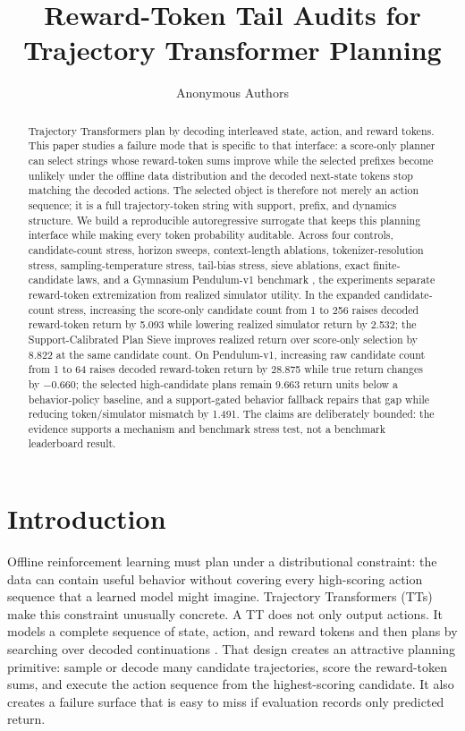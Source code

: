 \documentclass{article}
\title{Reward-Token Tail Audits for Trajectory Transformer Planning}
\author{Anonymous Authors}
\newcommand{\method}{Support-Calibrated Plan Sieve}
\begin{document}
\maketitle

\begin{abstract}
Trajectory Transformers plan by decoding interleaved state, action, and reward tokens. This paper studies a failure mode that is specific to that interface: a score-only planner can select strings whose reward-token sums improve while the selected prefixes become unlikely under the offline data distribution and the decoded next-state tokens stop matching the decoded actions. The selected object is therefore not merely an action sequence; it is a full trajectory-token string with support, prefix, and dynamics structure. We build a reproducible autoregressive surrogate that keeps this planning interface while making every token probability auditable. Across four controls, candidate-count stress, horizon sweeps, context-length ablations, tokenizer-resolution stress, sampling-temperature stress, tail-bias stress, sieve ablations, exact finite-candidate laws, and a Gymnasium Pendulum-v1 benchmark \citep{towers2024gymnasium}, the experiments separate reward-token extremization from realized simulator utility. In the expanded candidate-count stress, increasing the score-only candidate count from 1 to 256 raises decoded reward-token return by 5.093 while lowering realized simulator return by 2.532; the \method{} improves realized return over score-only selection by 8.822 at the same candidate count. On Pendulum-v1, increasing raw candidate count from 1 to 64 raises decoded reward-token return by 28.875 while true return changes by \(-0.660\); the selected high-candidate plans remain 9.663 return units below a behavior-policy baseline, and a support-gated behavior fallback repairs that gap while reducing token/simulator mismatch by 1.491. The claims are deliberately bounded: the evidence supports a mechanism and benchmark stress test, not a benchmark leaderboard result.
\end{abstract}

\section{Introduction}

Offline reinforcement learning must plan under a distributional constraint: the data can contain useful behavior without covering every high-scoring action sequence that a learned model might imagine. Trajectory Transformers (TTs) make this constraint unusually concrete. A TT does not only output actions. It models a complete sequence of state, action, and reward tokens and then plans by searching over decoded continuations \citep{janner2021trajectory}. That design creates an attractive planning primitive: sample or decode many candidate trajectories, score the reward-token sums, and execute the action sequence from the highest-scoring candidate. It also creates a failure surface that is easy to miss if evaluation records only predicted return.
\end{document}
